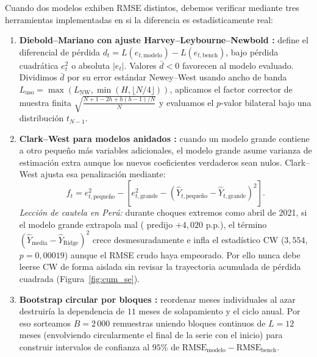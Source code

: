 \documentclass[12pt,letterpaper]{article}
\begin{document}
Cuando dos modelos exhiben RMSE distintos, debemos verificar mediante tres herramientas implementadas en  si la diferencia es estadísticamente real:
\begin{enumerate}
  \item \textbf{Diebold--Mariano con ajuste Harvey--Leybourne--Newbold \parencite{diebold1995, harvey1997}:} define el diferencial de pérdida \(d_t = L(e_{t,\text{modelo}}) - L(e_{t,\text{bench}})\), bajo pérdida cuadrática \(e_t^2\) o absoluta \(\lvert e_t \rvert\). Valores \(\bar{d} < 0\) favorecen al modelo evaluado. Dividimos \(\bar{d}\) por su error estándar Newey--West usando ancho de banda \(L_{\text{uso}} = \max(L_{\text{NW}}, \min(H, \lfloor N/4\rfloor))\), aplicamos el factor corrector de muestra finita \(\sqrt{\frac{N + 1 - 2h + h(h-1)/N}{N}}\) y evaluamos el \(p\)-valor bilateral bajo una distribución \(t_{N-1}\).
  \item \textbf{Clark--West para modelos anidados \parencite{clark2007}:} cuando un modelo grande contiene a otro pequeño más variables adicionales, el modelo grande asume varianza de estimación extra aunque los nuevos coeficientes verdaderos sean nulos. Clark--West ajusta esa penalización mediante:
  \begin{equation}
    f_t = e_{t,\text{pequeño}}^2 - \left[ e_{t,\text{grande}}^2 - (\widehat{Y}_{t,\text{pequeño}} - \widehat{Y}_{t,\text{grande}})^2 \right].
    \label{eq:clark_west}
  \end{equation}
  \emph{Lección de cautela en Perú:} durante choques extremos como abril de 2021, si el modelo grande extrapola mal ( predijo \(+4{,}020\) p.p.), el término \((\widehat{Y}_{\text{media}} - \widehat{Y}_{\text{Ridge}})^2\) crece desmesuradamente e infla el estadístico CW (\(3{,}554\), \(p=0{,}00019\)) aunque el RMSE crudo haya empeorado. Por ello nunca debe leerse CW de forma aislada sin revisar la trayectoria acumulada de pérdida cuadrada (Figura~\ref{fig:cum_se}).
  \item \textbf{Bootstrap circular por bloques \parencite{politis1992}:} reordenar meses individuales al azar destruiría la dependencia de \(11\) meses de solapamiento y el ciclo anual. Por eso sorteamos \(B = 2\,000\) remuestras uniendo bloques continuos de \(L = 12\) meses (envolviendo circularmente el final de la serie con el inicio) para construir intervalos de confianza al \(95\%\) de \(\text{RMSE}_{\text{modelo}} - \text{RMSE}_{\text{bench}}\).
\end{enumerate}
\end{document}

